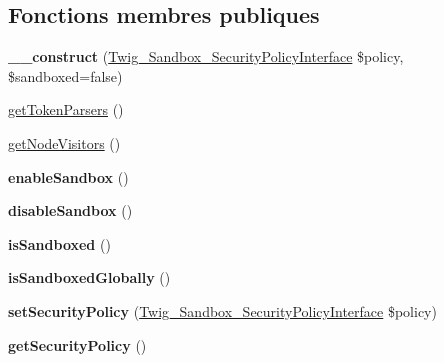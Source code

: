 \subsection*{Fonctions membres publiques}
\begin{DoxyCompactItemize}
\item 
{\bfseries \+\_\+\+\_\+construct} (\hyperlink{interface_twig___sandbox___security_policy_interface}{Twig\+\_\+\+Sandbox\+\_\+\+Security\+Policy\+Interface} \$policy, \$sandboxed=false)\hypertarget{class_twig___extension___sandbox_ac5ff22259bef44877658cd1480195054}{}\label{class_twig___extension___sandbox_ac5ff22259bef44877658cd1480195054}

\item 
\hyperlink{class_twig___extension___sandbox_a8fd35903c3d01c0f0078f59d142eb063}{get\+Token\+Parsers} ()
\item 
\hyperlink{class_twig___extension___sandbox_aec02093179d390d22ae4083f23a1d74a}{get\+Node\+Visitors} ()
\item 
{\bfseries enable\+Sandbox} ()\hypertarget{class_twig___extension___sandbox_a600e5a46866244eeab5d8f636b650038}{}\label{class_twig___extension___sandbox_a600e5a46866244eeab5d8f636b650038}

\item 
{\bfseries disable\+Sandbox} ()\hypertarget{class_twig___extension___sandbox_a67cb7ebf016af9678f9acf281090d5f1}{}\label{class_twig___extension___sandbox_a67cb7ebf016af9678f9acf281090d5f1}

\item 
{\bfseries is\+Sandboxed} ()\hypertarget{class_twig___extension___sandbox_a9ae706ad5e62b4e7370f82b56666719d}{}\label{class_twig___extension___sandbox_a9ae706ad5e62b4e7370f82b56666719d}

\item 
{\bfseries is\+Sandboxed\+Globally} ()\hypertarget{class_twig___extension___sandbox_aea61ea6174f3aa5ce828eedb89d2687a}{}\label{class_twig___extension___sandbox_aea61ea6174f3aa5ce828eedb89d2687a}

\item 
{\bfseries set\+Security\+Policy} (\hyperlink{interface_twig___sandbox___security_policy_interface}{Twig\+\_\+\+Sandbox\+\_\+\+Security\+Policy\+Interface} \$policy)\hypertarget{class_twig___extension___sandbox_a9afe284f8113d071dab789170219913b}{}\label{class_twig___extension___sandbox_a9afe284f8113d071dab789170219913b}

\item 
{\bfseries get\+Security\+Policy} ()\hypertarget{class_twig___extension___sandbox_aa36464dbb9342e32f1b6513dc35861b4}{}\label{class_twig___extension___sandbox_aa36464dbb9342e32f1b6513dc35861b4}


\end{DoxyCompactItemize}
